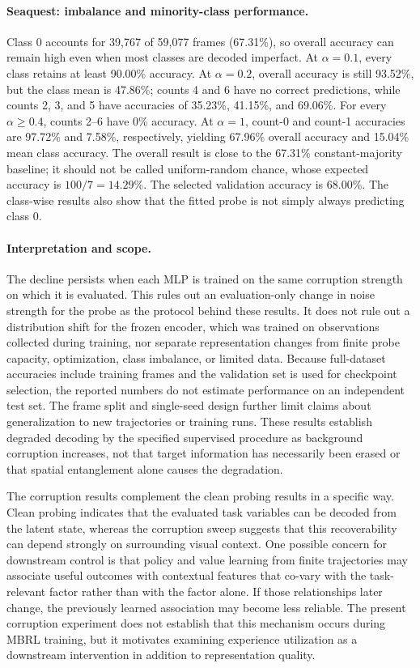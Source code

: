\documentclass{article} %
\begin{document}
\paragraph{Seaquest: imbalance and minority-class performance.}
Class 0 accounts for 39,767 of 59,077 frames (67.31\%), so overall accuracy can remain high even when most classes are decoded imperfact. At $\alpha=0.1$, every class retains at least 90.00\% accuracy. At $\alpha=0.2$, overall accuracy is still 93.52\%, but the class mean is 47.86\%; counts 4 and 6 have no correct predictions, while counts 2, 3, and 5 have accuracies of 35.23\%, 41.15\%, and 69.06\%. For every $\alpha\geq0.4$, counts 2--6 have 0\% accuracy. At $\alpha=1$, count-0 and count-1 accuracies are 97.72\% and 7.58\%, respectively, yielding 67.96\% overall accuracy and 15.04\% mean class accuracy. The overall result is close to the 67.31\% constant-majority baseline; it should not be called uniform-random chance, whose expected accuracy is $100/7=14.29\%$. The selected validation accuracy is 68.00\%. The class-wise results also show that the fitted probe is not simply always predicting class 0.

\paragraph{Interpretation and scope.}
The decline persists when each MLP is trained on the same corruption strength on which it is evaluated. This rules out an evaluation-only change in noise strength for the probe as the protocol behind these results. It does not rule out a distribution shift for the frozen encoder, which was trained on observations collected during training, nor separate representation changes from finite probe capacity, optimization, class imbalance, or limited data. Because full-dataset accuracies include training frames and the validation set is used for checkpoint selection, the reported numbers do not estimate performance on an independent test set. The frame split and single-seed design further limit claims about generalization to new trajectories or training runs. These results establish degraded decoding by the specified supervised procedure as background corruption increases, not that target information has necessarily been erased or that spatial entanglement alone causes the degradation.

The corruption results complement the clean probing results in a specific way. Clean probing indicates that the evaluated task variables can be decoded from the latent state, whereas the corruption sweep suggests that this recoverability can depend strongly on surrounding visual context. One possible concern for downstream control is that policy and value learning from finite trajectories may associate useful outcomes with contextual features that co-vary with the task-relevant factor rather than with the factor alone. If those relationships later change, the previously learned association may become less reliable. The present corruption experiment does not establish that this mechanism occurs during MBRL training, but it motivates examining experience utilization as a downstream intervention in addition to representation quality.
\end{document}

